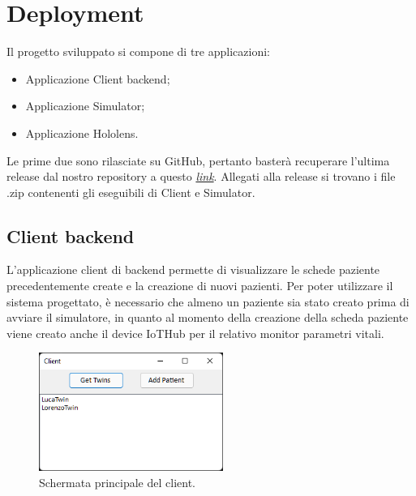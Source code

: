 \chapter{Deployment}
Il progetto sviluppato si compone di tre applicazioni:

\begin{itemize}
    \item Applicazione Client backend;
    \item Applicazione Simulator;
    \item Applicazione Hololens.
\end{itemize}

Le prime due sono rilasciate su GitHub, pertanto basterà recuperare l'ultima release dal nostro repository a questo \href{https://github.com/lucagiorgettismp/AzureHealthcareDigitalTwins/releases}{\textit{link}}.
Allegati alla release si trovano i file .zip contenenti gli eseguibili di Client e Simulator.

\section{Client backend}
L'applicazione client di backend permette di visualizzare le schede paziente precedentemente create e la creazione di nuovi pazienti. Per poter utilizzare il sistema progettato, è necessario che almeno un paziente sia stato creato prima di avviare il simulatore, in quanto al momento della creazione della scheda paziente viene creato anche il device IoTHub per il relativo monitor parametri vitali.

\begin{figure}[H]
    \includegraphics[width=6cm]{Images/client_screen.png}
    \centering
    \caption{\label{pic:client-deployment}Schermata principale del client.}
\end{figure}

